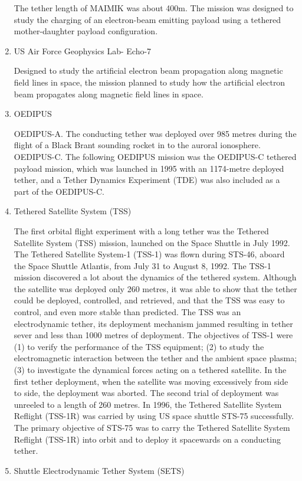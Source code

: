 \begin{enumerate}
	The tether length of MAIMIK was about 400m. The mission was designed to study the charging of an electron-beam emitting payload using a tethered mother-daughter payload configuration. 

\item{US Air Force Geophysics Lab- Echo-7}

Designed to study the artificial electron beam propagation along magnetic field lines in space, the mission planned to study how the artificial electron beam propagates along magnetic field lines in space.
\item{OEDIPUS}

OEDIPUS-A. The conducting tether was deployed over 985 metres during the flight of a Black Brant sounding rocket in to the auroral ionosphere.
OEDIPUS-C. The following OEDIPUS mission was the OEDIPUS-C tethered payload mission, which was launched in 1995 with an 1174-metre deployed tether, and a Tether Dynamics Experiment (TDE) was also included as a part of the OEDIPUS-C.
\item{Tethered Satellite System (TSS)}

The first orbital flight experiment with a long tether was the Tethered Satellite System (TSS) mission, launched on the Space Shuttle in July 1992. The Tethered Satellite System-1 (TSS-1) was flown during STS-46, aboard the Space Shuttle Atlantis, from July 31 to August 8, 1992. The TSS-1 mission discovered a lot about the dynamics of the tethered system. Although the satellite was deployed only 260 metres, it was able to show that the tether could be deployed, controlled, and retrieved, and that the TSS was easy to control, and even more stable than predicted. The TSS was an electrodynamic tether, its deployment mechanism jammed resulting in tether sever and less than 1000 metres of deployment. The objectives of TSS-1 were (1) to verify the performance of the TSS equipment; (2) to study the electromagnetic interaction between the tether and the ambient space plasma; (3) to investigate the dynamical forces acting on a tethered satellite. In the first tether deployment, when the satellite was moving excessively from side to side, the deployment was aborted. The second trial of deployment was unreeled to a length of 260 metres.
In 1996, the Tethered Satellite System Reflight (TSS-1R) was carried by using US space shuttle STS-75 successfully. The primary objective of STS-75 was to carry the Tethered Satellite System Reflight (TSS-1R) into orbit and to deploy it spacewards on a conducting tether.
\item{Shuttle Electrodynamic Tether System (SETS)}


\end{enumerate}
